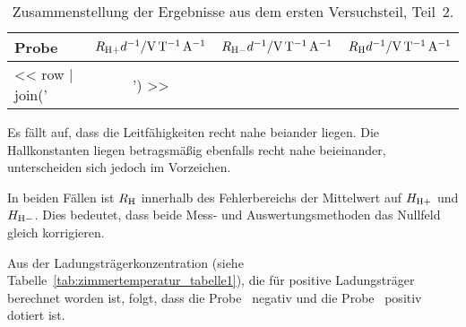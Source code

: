 \begin{table}[htbp]
    \centering
    \begin{tabular}{lSSS}
        Probe &
        {$R_{\text H+} d^{-1} / \si{\volt\per\tesla\per\ampere}$} &
        {$R_{\text H-} d^{-1} / \si{\volt\per\tesla\per\ampere}$} &
        {$R_{\text H} d^{-1} / \si{\volt\per\tesla\per\ampere}$} \\
        \midrule
        << row | join(' & ') >> \\
    \end{tabular}
    \caption{%
        Zusammenstellung der Ergebnisse aus dem ersten Versuchsteil, Teil~2.
    }
    \label{tab:zimmertemperatur_tabelle2}
\end{table}

Es fällt auf, dass die Leitfähigkeiten recht nahe beiander
liegen. Die Hallkonstanten liegen betragsmäßig ebenfalls recht nahe
beieinander, unterscheiden sich jedoch im Vorzeichen.

In beiden Fällen ist $R_\text H$ innerhalb des Fehlerbereichs der Mittelwert
auf $H_{\text H+}$ und $H_{\text H-}$. Dies bedeutet, dass beide Mess- und
Auswertungsmethoden das Nullfeld gleich korrigieren.

Aus der Ladungsträgerkonzentration (siehe
Tabelle~\ref{tab:zimmertemperatur_tabelle1}), die für positive Ladungsträger
berechnet worden ist, folgt, dass die Probe~\probeA{} negativ und die
Probe~\probeB{} positiv dotiert ist.

\printbibliography



